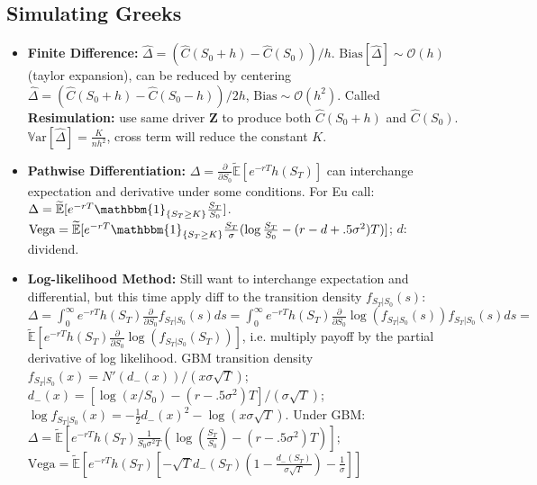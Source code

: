 \documentclass[9pt, landscape]{article}
\begin{document}
\begin{multicols*}{3}
\section{Simulating Greeks}
\begin{itemize}
	\item \textbf{Finite Difference:} $\widehat{\Delta}=(\widehat{C}(S_0+h)-\widehat{C}(S_0))/h$. $\text{Bias}[\widehat{\Delta}]\sim\mathcal{O}(h)$ (taylor expansion), can be reduced by centering $\widehat{\Delta}=(\widehat{C}(S_0+h)-\widehat{C}(S_0-h))/2h$, $\text{Bias}\sim\mathcal{O}(h^2)$. Called \textbf{Resimulation:} use same driver $\bm{Z}$ to produce both $\widehat{C}(S_0+h)$ and $\widehat{C}(S_0)$. $\mathrm{\mathbb{V}ar}[\widehat{\Delta}] = \frac{K}{nh^2}$, cross term will reduce the constant $K$.
	\item \textbf{Pathwise Differentiation:} $\Delta = \frac{\partial }{\partial S_0}\widetilde{\mathbb{E}}[e^{-rT}h(S_T)]$ can interchange expectation and derivative under some conditions. For Eu call: $\Delta=\widetilde{\mathbb{E}}[e^{-rT}\mathbbm{1}_{\{S_T\geq K\}}\frac{S_T}{S_0}]$. \\$\text{Vega}=\widetilde{\mathbb{E}}[e^{-rT}\mathbbm{1}_{\{S_T\geq K\}}\frac{S_T}{\sigma}(\log\frac{S_T}{S_0}-(r-d+.5\sigma^2)T)]$; $d$: dividend.
	\item \textbf{Log-likelihood Method:} Still want to interchange expectation and differential, but this time apply diff to the transition density $f_{S_T|S_0}(s)$: $\Delta = \int_0^{\infty}e^{-rT}h(S_T)\frac{\partial }{\partial S_0}f_{S_T|S_0}(s)ds = \int_0^{\infty}e^{-rT}h(S_T)\frac{\partial }{\partial S_0}\log(f_{S_T|S_0}(s))f_{S_T|S_0}(s)ds = $\\$\widetilde{\mathbb{E}}[e^{-rT}h(S_T)\frac{\partial }{\partial S_0}\log(f_{S_T|S_0}(S_T))]$, i.e. multiply payoff by the partial derivative of log likelihood. GBM transition density $f_{S_T|S_0}(x)=N'(d_-(x))/(x\sigma\sqrt{T})$; $d_-(x)=[\log(x/S_0)-(r-.5\sigma^2)T]/(\sigma\sqrt{T})$; $\log f_{S_T|S_0}(x) = -\frac{1}{2}d_-(x)^2 - \log(x\sigma\sqrt{T})$. Under GBM:\\
	$\Delta=\widetilde{\mathbb{E}}[e^{-rT}h(S_T)\frac{1}{S_0\sigma^2T}(\log(\frac{S_T}{S_0})-(r-.5\sigma^2)T)]$; \\$\text{Vega}=\widetilde{\mathbb{E}}[e^{-rT}h(S_T)[-\sqrt{T}d_-(S_T)(1-\frac{d_-(S_T)}{\sigma\sqrt{T}}) - \frac{1}{\sigma}]]$
\end{itemize}

\end{multicols*}
\end{document}
